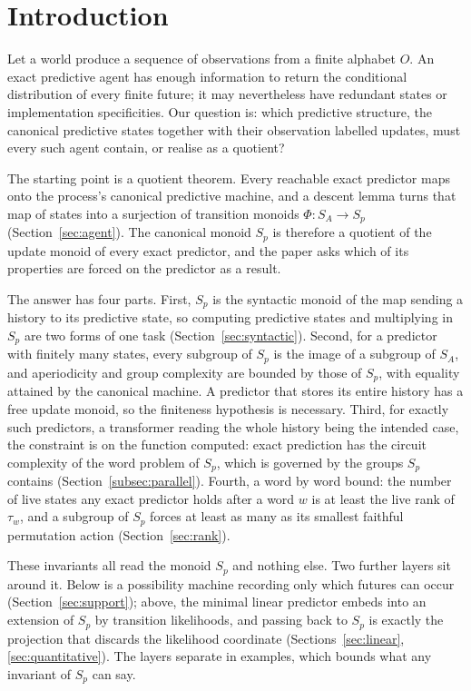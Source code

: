 \documentclass[10pt]{article}
\theoremstyle{definition}
\theoremstyle{remark}
\newcommand{\Obs}{O}
\begin{document}
\section{Introduction}
\label{sec:positioning}

Let a world produce a sequence of observations from a finite alphabet
$\Obs$.  An exact predictive agent has enough information to return
the conditional distribution of every finite future; it may
nevertheless have redundant states or implementation specificities.
Our question is: which predictive structure, the canonical
predictive states together with their observation labelled updates,
must every such agent contain, or realise as a quotient?

The starting point is a quotient theorem.  Every reachable exact
predictor maps onto the process's canonical predictive machine, and a
descent lemma turns that map of states into a surjection of
transition monoids $\Phi:S_A\to S_p$ (Section~\ref{sec:agent}).  The
canonical monoid $S_p$ is therefore a quotient of the update monoid
of every exact predictor, and the paper asks which of its properties
are forced on the predictor as a result.

The answer has four parts.  First, $S_p$ is the syntactic monoid of
the map sending a history to its predictive state, so computing
predictive states and multiplying in $S_p$ are two forms of one task
(Section~\ref{sec:syntactic}).  Second, for a predictor with finitely
many states, every subgroup of $S_p$ is the image of a subgroup of
$S_A$, and aperiodicity and group complexity are bounded by those of
$S_p$, with equality attained by the canonical machine.  A predictor
that stores its entire history has a free update monoid, so the
finiteness hypothesis is necessary.  Third, for exactly such
predictors, a transformer reading the whole history being the
intended case, the constraint is on the function computed: exact
prediction has the circuit complexity of the word problem of $S_p$,
which is governed by the groups $S_p$ contains
(Section~\ref{subsec:parallel}).  Fourth, a word by word bound: the
number of live states any exact predictor holds after a word $w$ is
at least the live rank of $\tau_w$, and a subgroup of $S_p$ forces at
least as many as its smallest faithful permutation action
(Section~\ref{sec:rank}).

These invariants all read the monoid $S_p$ and nothing else.  Two
further layers sit around it.  Below is a possibility machine
recording only which futures can occur (Section~\ref{sec:support});
above, the minimal linear predictor embeds into an extension of $S_p$
by transition likelihoods, and passing back to $S_p$ is exactly the
projection that discards the likelihood coordinate
(Sections~\ref{sec:linear}, \ref{sec:quantitative}).  The layers
separate in examples, which bounds what any invariant of $S_p$ can
say.
\end{document}
